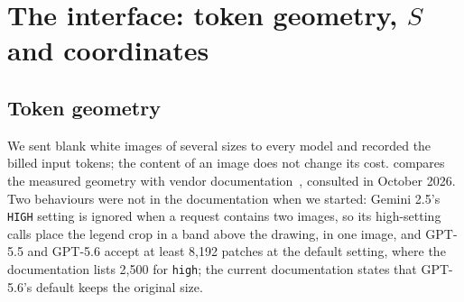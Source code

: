 \section{The interface: token geometry, $S$ and coordinates}
\label{sec:interface}

\subsection{Token geometry}
\label{sec:geometry}

We sent blank white images of several sizes to every model and recorded the billed input tokens; the content of an image does not change its cost.  compares the measured geometry with vendor documentation~\cite{openai2026vision,anthropic2026vision,google2026mediares}, consulted in October 2026. Two behaviours were not in the documentation when we started: Gemini 2.5's \texttt{HIGH} setting is ignored when a request contains two images, so its high-setting calls place the legend crop in a band above the drawing, in one image, and GPT-5.5 and GPT-5.6 accept at least 8{,}192 patches at the default setting, where the documentation lists 2{,}500 for \texttt{high}; the current documentation states that GPT-5.6's default keeps the original size.


